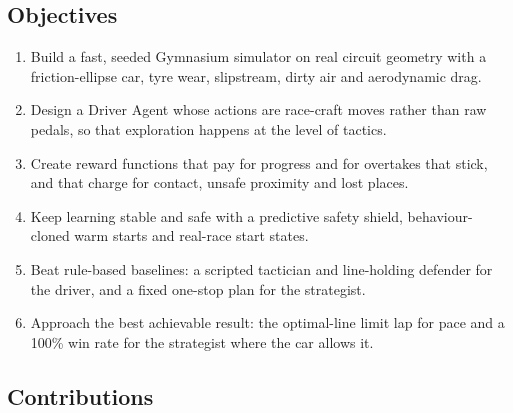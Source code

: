 \documentclass{ieeeaccess}
\providecommand{\tightlist}{\setlength{\itemsep}{0pt}\setlength{\parskip}{0pt}}
\begin{document}
\subsection{Objectives}

\begin{enumerate}
\def\labelenumi{\arabic{enumi}.}
\tightlist
\item
  Build a fast, seeded Gymnasium simulator on real circuit geometry with a
  friction-ellipse car, tyre wear, slipstream, dirty air and aerodynamic drag.
\item
  Design a Driver Agent whose actions are race-craft moves rather than raw
  pedals, so that exploration happens at the level of tactics.
\item
  Create reward functions that pay for progress and for overtakes that stick,
  and that charge for contact, unsafe proximity and lost places.
\item
  Keep learning stable and safe with a predictive safety shield, behaviour-cloned
  warm starts and real-race start states.
\item
  Beat rule-based baselines: a scripted tactician and line-holding defender for
  the driver, and a fixed one-stop plan for the strategist.
\item
  Approach the best achievable result: the optimal-line limit lap for pace and a
  100\% win rate for the strategist where the car allows it.
\end{enumerate}

\subsection{Contributions}
\end{document}
